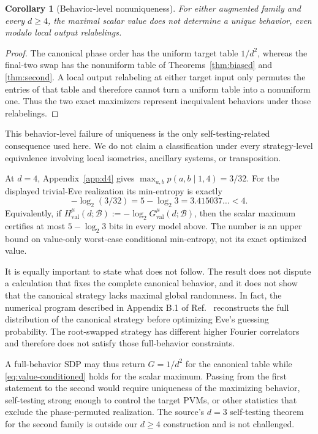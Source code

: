 \documentclass[11pt]{article}
\newtheorem{corollary}[theorem]{Corollary}
\theoremstyle{definition}
\theoremstyle{remark}
\begin{document}
\begin{corollary}[Behavior-level nonuniqueness]
\label{cor:behavior-nonunique}
For either augmented family and every \(d\geq4\), the maximal scalar value
does not determine a unique behavior, even modulo local output relabelings.
\end{corollary}

\begin{proof}
The canonical phase order has the uniform target table \(1/d^2\), whereas
the final-two swap has the nonuniform table of
Theorems~\ref{thm:biased} and \ref{thm:second}.  A local output relabeling at
either target input only permutes the entries of that table and therefore
cannot turn a uniform table into a nonuniform one.  Thus the two exact
maximizers represent inequivalent behaviors under those relabelings.
\end{proof}

This behavior-level failure of uniqueness is the only self-testing-related
consequence used here.  We do not claim a classification under every
strategy-level equivalence involving local isometries, ancillary systems, or
transposition.

At \(d=4\), Appendix~\ref{app:d4} gives
\(\max_{a,b}p(a,b\mid1,4)=3/32\).  For the displayed trivial-Eve
realization its min-entropy is exactly
\begin{equation}
 -\log_2(3/32)=5-\log_2 3=3.415037\ldots<4.
 \label{eq:d4-entropy}
\end{equation}
Equivalently, if
\(H_{\mathrm{val}}^\mu(d;\mathcal B)
:=-\log_2G_{\mathrm{val}}^\mu(d;\mathcal B)\), then the scalar maximum
certifies at most \(5-\log_2 3\) bits in every model above.  The
number is an upper bound on value-only worst-case conditional min-entropy,
not its exact optimized value.

It is equally important to state what does not follow.  The result does not
dispute a calculation that fixes the complete canonical behavior, and it does
not show that the canonical strategy lacks maximal global randomness.  In
fact, the numerical program described in Appendix B.1 of
Ref.~\cite{PeritoEtAl2026} reconstructs the full distribution of the
canonical strategy before optimizing Eve's guessing probability.  The
root-swapped strategy has different higher Fourier correlators and therefore
does not satisfy those full-behavior constraints.

A full-behavior SDP may thus return \(G=1/d^2\) for the canonical table while
\eqref{eq:value-conditioned} holds for the scalar maximum.  Passing from the
first statement to the second would require uniqueness of the maximizing
behavior, self-testing strong enough to control the target PVMs, or other
statistics that exclude the phase-permuted realization.  The source's
\(d=3\) self-testing theorem for the second family is outside our
\(d\geq4\) construction and is not challenged.
\end{document}
